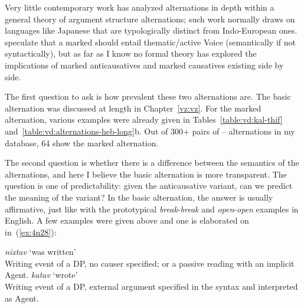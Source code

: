 \begin{exe}
\begin{xlist}
\begin{xlist}
\begin{exe}
\begin{exe}
\begin{xlist}
\begin{exe}
\begin{xlist}
\begin{exe}
\begin{xlist}
\begin{xlist}
\begin{exe}
\begin{xlist}
\begin{exe}
\begin{xlist}
\begin{exe}
\begin{exe}
\begin{exe}
\begin{xlist}
\begin{exe}
\begin{exe}
\begin{xlist}
\begin{xlist}
\begin{exe}
\begin{xlist}
\begin{exe}
\begin{exe}
\begin{exe}
\begin{xlist}
\begin{exe}
\begin{exe}
\begin{xlist}
\begin{exe}
\begin{xlist}
\begin{exe}
\begin{xlist}
\begin{exe}
\begin{xlist}
\begin{exe}
Very little contemporary work has analyzed  alternations in depth within a general theory of argument structure alternations; such work normally draws on languages like Japanese \citep{jacobsen92} that are typologically distinct from Indo-European ones. \citet[62ff]{layering15} speculate that a marked  should entail thematic/active Voice (semantically if not syntactically), but as far as I know no formal theory has explored the implications of marked anticausatives and marked causatives existing side by side.

The first question to ask is how prevalent these two alternations are. The basic alternation was discussed at length in Chapter~\ref{vz:vz}. For the marked alternation, various examples were already given in Tables~\ref{table:vd:kal-thif} and~\ref{table:vd:alternations-heb-long}b. Out of 300+ pairs of {\tkal}--{\thif} alternations in my database, 64 show the marked alternation.

The second question is whether there is a difference between the semantics of the alternations, and here I believe the basic alternation is more transparent. The question is one of predictability: given the anticausative variant, can we predict the meaning of the  variant? In the basic alternation, the answer is usually affirmative, just like with the prototypical \emph{break}-\emph{break} and \emph{open}-\emph{open} examples in English. A few examples were given  above and one is elaborated on in~(\ref{ex:4n28}):
 \begin{exe}
 \ex  \label{ex:4n28}
 \begin{xlist} 
 	\ex  \emph{nixtav} `was written' \\
		Writing event of a DP, no causer specified; or a passive reading with an implicit Agent.
 	\ex  \emph{katav} `wrote' \\
		Writing event of a DP, external argument specified in the syntax and interpreted as Agent.
 \z
\z 


\end{xlist}
\end{exe}
\end{exe}
\end{xlist}
\end{exe}
\end{xlist}
\end{exe}
\end{xlist}
\end{exe}
\end{xlist}
\end{exe}
\end{exe}
\end{xlist}
\end{exe}
\end{exe}
\end{exe}
\end{xlist}
\end{exe}
\end{xlist}
\end{xlist}
\end{exe}
\end{exe}
\end{xlist}
\end{exe}
\end{exe}
\end{exe}
\end{xlist}
\end{exe}
\end{xlist}
\end{exe}
\end{xlist}
\end{xlist}
\end{exe}
\end{xlist}
\end{exe}
\end{xlist}
\end{exe}
\end{exe}
\end{xlist}
\end{xlist}
\end{exe}
